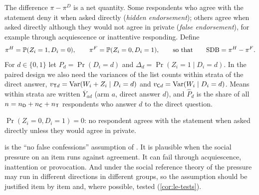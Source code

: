 The difference $\pi-\pi^D$ is a net quantity. Some respondents who agree with the statement deny it when asked directly (\emph{hidden endorsement}); others agree when asked directly although they would not agree in private (\emph{false endorsement}), for example through acquiescence or inattentive responding. Define
\[
  \pi^H=\mathbb{P}(Z_i=1,D_i=0),\qquad \pi^F=\mathbb{P}(Z_i=0,D_i=1),\qquad\text{so that}\qquad \mathrm{SDB}=\pi^H-\pi^F .
\]
For $d\in\{0,1\}$ let $P_d=\Pr(D_i=d)$ and $\Delta_d=\Pr(Z_i=1\mid D_i=d)$. In the paired design we also need the variances of the list counts within strata of the direct answer, $v_{\mathsf{T} d}=\operatorname{Var}(W_i+Z_i\mid D_i=d)$ and $v_{\mathsf{C} d}=\operatorname{Var}(W_i\mid D_i=d)$. Means within strata are written $\overline Y_{ad}$ (arm $a$, direct answer $d$), and $\widehat P_d$ is the share of all $n=n_{\mathsf{D}}+n_{\mathsf{C}}+n_{\mathsf{T}}$ respondents who answer $d$ to the direct question.

\begin{assumption}[Monotonicity]\label{asm:le-mono}
$\Pr(Z_i=0,D_i=1)=0$: no respondent agrees with the statement when asked directly unless they would agree in private.
\end{assumption}

 is the ``no false confessions'' assumption of \citet{aronow2015}. It is plausible when the social pressure on an item runs against agreement. It can fail through acquiescence, inattention or provocation. And under the social reference theory of \citet{blair2020} the pressure may run in different directions in different groups, so the assumption should be justified item by item and, where possible, tested (\cref{cor:le-tests}).

